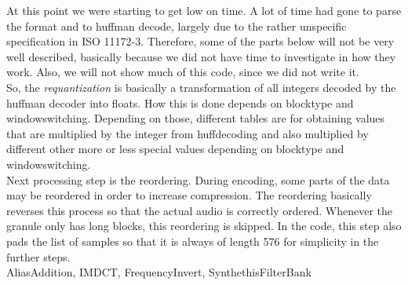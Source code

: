 \documentclass[a4paper,12pt]{article}
\begin{document}
        At this point we were starting to get low on time. A lot of time had
        gone to parse the format and to huffman decode, largely due to the
        rather unspecific specification in ISO 11172-3. Therefore, some of the
        parts below will not be very well described, basically because we did
        not have time to investigate in how they work. Also, we will not show
        much of this code, since we did not write it. \\

        So, the \textit{requantization} is basically a transformation of all
        integers decoded by the huffman decoder into floats. How this is done
        depends on blocktype and windowswitching. Depending on those, different
        tables are for obtaining values that are multiplied by the integer from
        huffdecoding and also multiplied by different other more or less special
        values depending on blocktype and windowswitching. \\

        Next processing step is the reordering. During encoding, some parts of
        the data may be reordered in order to increase compression. The
        reordering basically reverses this process so that the actual audio is
        correctly ordered. Whenever the granule only has long blocks, this
        reordering is skipped. In the code, this step also pads the list of
        samples so that it is always of length 576 for simplicity in the further
        steps. \\

        AliasAddition, IMDCT, FrequencyInvert, SynthethisFilterBank \\
\end{document}
